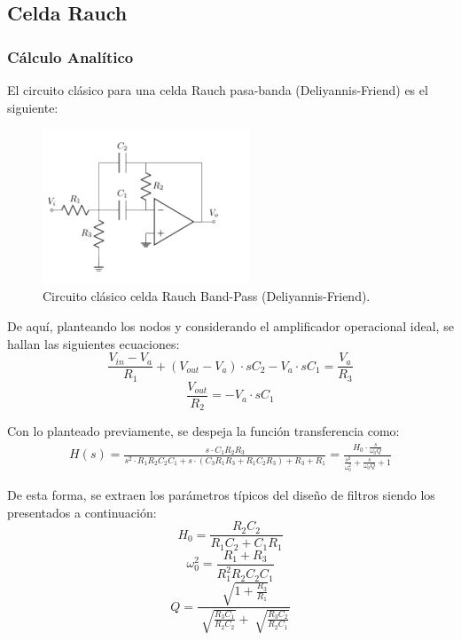 \subsection{Celda Rauch}
\subsubsection{Cálculo Analítico}
El circuito clásico para una celda 	Rauch pasa-banda (Deliyannis-Friend) es el siguiente:
\begin{figure}[H]
\centering
	\includegraphics[width=0.55\textwidth, page=1]{Imagenes-Ej2/Circuitos.pdf}
	\caption{Circuito clásico celda Rauch Band-Pass (Deliyannis-Friend).}
	\label{fig:rauch1}
\end{figure}

De aquí, planteando los nodos y considerando el amplificador operacional ideal, se hallan las siguientes ecuaciones:
\begin{equation}
	\frac{V_{in}-V_a}{R_1}+(V_{out}-V_a)\cdot sC_2 -V_a \cdot sC_1 = \frac{V_a}{R_3}
\end{equation}
\begin{equation}
	\frac{V_{out}}{R_2}=-V_a\cdot sC_1
\end{equation}

Con lo planteado previamente, se despeja la función transferencia como:
\begin{align}
H(s)=\frac{s \cdot C_1R_2R_3}{s^2\cdot R_1R_2C_2C_1+s\cdot (C_3R_1R_3+R_1C_2R_3)+R_3+R_1}=\frac{H_0 \cdot \frac{s}{\omega_0 Q}}{\frac{s^2}{\omega_0^2}+\frac{s}{\omega_0Q}+1}
\end{align}

De esta forma, se extraen los parámetros típicos del diseño de filtros siendo los presentados a continuación:
\begin{equation}
	H_0 =\frac{R_2C_2}{R_1C_2+C_1R_1}
\end{equation}
\begin{equation}
	\omega_0^2= \frac{R_1+R_3}{R_1^2R_2C_2C_1}
\end{equation}
\begin{equation}
	Q= \frac{\sqrt[]{1+\frac{R_3}{R_1}}}{{\sqrt[]{\frac{R_3C_1}{R_2C_2}}+\sqrt[]{\frac{R_3C_2}{R_2C_1}}}}
\end{equation}

